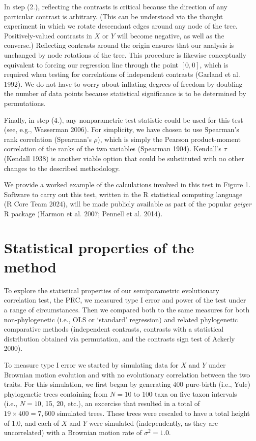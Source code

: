 \documentclass[fleqn,10pt,lineno]{wlpeerj} %
\begin{document}
In step (2.), reflecting the contrasts is critical because the direction of any particular contrast is arbitrary. (This can be understood via the thought experiment in which we rotate descendant edges around any node of the tree. Positively-valued contrasts in \(X\) or \(Y\) will become negative, as well as the converse.) Reflecting contrasts around the origin ensures that our analysis is unchanged by node rotations of the tree. This procedure is likewise conceptually equivalent to forcing our regression line through the point \([0,0]\), which is required when testing for correlations of independent contrasts (Garland et al. 1992). We do not have to worry about inflating degrees of freedom by doubling the number of data points because statistical significance is to be determined by permutations.

Finally, in step (4.), any nonparametric test statistic could be used for this test (see, e.g., Wasserman 2006). For simplicity, we have chosen to use Spearman's rank correlation (Spearman's \(\rho\)), which is simply the Pearson product-moment correlation of the ranks of the two variables (Spearman 1904). Kendall's \(\tau\) (Kendall 1938) is another viable option that could be substituted with no other changes to the described methodology.

We provide a worked example of the calculations involved in this test in Figure 1. Software to carry out this test, written in the R statistical computing language (R Core Team 2024), will be made publicly available as part of the popular \emph{geiger} R package (Harmon et al. 2007; Pennell et al. 2014).

\section{Statistical properties of the method}\label{statistical-properties-of-the-method}

To explore the statistical properties of our semiparametric evolutionary correlation test, the PRC, we measured type I error and power of the test under a range of circumstances. Then we compared both to the same measures for both non-phylogenetic (i.e., OLS or `standard' regression) and related phylogenetic comparative methods (independent contrasts, contrasts with a statistical distribution obtained via permutation, and the contrasts sign test of Ackerly 2000).

To measure type I error we started by simulating data for \(X\) and \(Y\) under Brownian motion evolution and with no evolutionary correlation between the two traits. For this simulation, we first began by generating 400 pure-birth (i.e., Yule) phylogenetic trees containing from \(N=10\) to 100 taxa on five taxon intervals (i.e., \(N=10\), 15, 20, etc.), an excercise that resulted in a total of \(19 \times 400 = 7,600\) simulated trees. These trees were rescaled to have a total height of 1.0, and each of \(X\) and \(Y\) were simulated (independently, as they are uncorrelated) with a Brownian motion rate of \(\sigma^2 = 1.0\).
\end{document}
